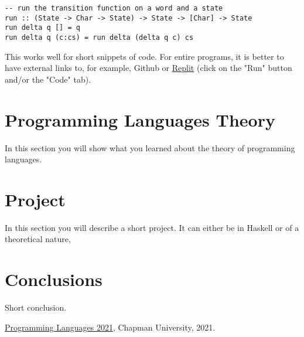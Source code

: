 \documentclass{article}
\begin{document}
\begin{lstlisting}
-- run the transition function on a word and a state
run :: (State -> Char -> State) -> State -> [Char] -> State
run delta q [] = q
run delta q (c:cs) = run delta (delta q c) cs 
\end{lstlisting}

\medskip\noindent
This works well for short snippets of code. For entire programs, it is better to have external links to, for example, Github or \href{https://replit.com/@alexhkurz/automata01#main.hs}{Replit} (click on the "Run" button and/or the "Code" tab).


\section{Programming Languages Theory}

In this section you will show what you learned about the theory of programming languages. 

\section{Project}

In this section you will describe a short project. It can either be in Haskell or of a theoretical nature,

\section{Conclusions}\label{conclusions}
Short conclusion. 

\begin{thebibliography}{99}
 \href{https://github.com/alexhkurz/programming-languages-2021/blob/main/README.md}{Programming Languages 2021}, Chapman University, 2021.
\end{thebibliography}
\end{document}

